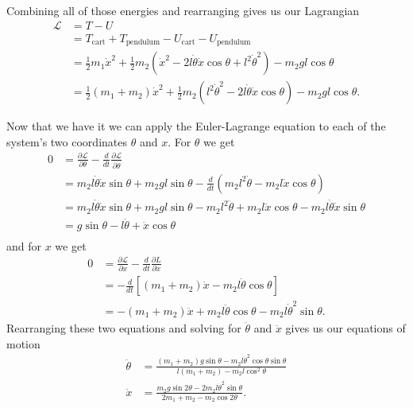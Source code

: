 \documentclass{article}
\begin{document}
Combining all of those energies and rearranging gives us our Lagrangian \begin{align*}
  \mathcal{L} & = T - U                                                                                                                                     \\
              & = T_\text{cart} + T_\text{pendulum} - U_\text{cart} - U_\text{pendulum}                                                                     \\
              & = \frac{1}{2} m_1 \dot{x}^2 + \frac{1}{2} m_2 (\dot{x}^2 - 2 l \dot{\theta} \dot{x} \cos \theta + l^2 \dot{\theta}^2) - m_2 g l \cos \theta \\
              & = \frac{1}{2} (m_1 + m_2) \dot{x}^2 + \frac{1}{2} m_2 (l^2 \dot{\theta}^2 - 2 l \dot{\theta} \dot{x} \cos \theta) - m_2 g l \cos \theta.
\end{align*}

Now that we have it we can apply the Euler-Lagrange equation to each of the system's two coordinates $\theta$ and $x$. For $\theta$ we get \begin{align*}
  0 & = \frac{\partial \mathcal{L}}{\partial \theta} - \frac{d}{d t} \frac{\partial \mathcal{L}}{\partial \dot{\theta}}                                            \\
    & = m_2 l \dot{\theta} \dot{x} \sin \theta + m_2 g l \sin \theta - \frac{d}{d t} (m_2 l^2 \dot{\theta} - m_2 l \dot{x} \cos \theta)                            \\
    & = m_2 l \dot{\theta} \dot{x} \sin \theta + m_2 g l \sin \theta - m_2 l^2 \ddot{\theta} + m_2 l \ddot{x} \cos \theta - m_2 l \dot{\theta} \dot{x} \sin \theta \\
    & = g \sin \theta - l \ddot{\theta} + \ddot{x} \cos \theta                                                                                                     \\
\end{align*} and for $x$ we get \begin{align*}
  0 & = \frac{\partial \mathcal{L}}{\partial x} - \frac{d}{d t} \frac{\partial L}{\partial \dot{x}} \\
    & = -\frac{d}{d t} [(m_1 + m_2) \dot{x} - m_2 l \dot{\theta} \cos \theta]                       \\
    & = -(m_1 + m_2) \ddot{x} + m_2 l \ddot{\theta} \cos \theta - m_2 l \dot{\theta}^2 \sin \theta.
\end{align*} Rearranging these two equations and solving for $\ddot{\theta}$ and $\ddot{x}$ gives us our equations of motion \begin{align*}
  \ddot{\theta} & = \frac{(m_1 + m_2) g \sin \theta - m_2 l \dot{\theta}^2 \cos \theta \sin \theta}{l (m_1 + m_2) - m_2 l \cos^2 \theta} \\
  \ddot{x}      & = \frac{m_2 g \sin 2 \theta - 2 m_2 l \dot{\theta}^2 \sin \theta}{2 m_1 + m_2 - m_2 \cos 2 \theta}.
\end{align*}
\end{document}
